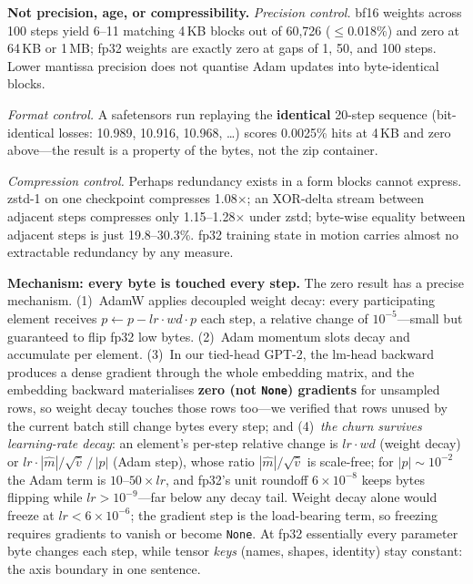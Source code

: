 \documentclass[sigconf,10pt,anonymous,review]{acmart}
\begin{document}
\noindent\textbf{Not precision, age, or compressibility.}
\emph{Precision control.} bf16 weights across 100 steps yield 6--11
matching 4\,KB blocks out of 60,726 ($\le$0.018\%) and zero at 64\,KB or
1\,MB; fp32 weights are exactly zero at gaps of 1, 50, and 100 steps.
Lower mantissa precision does not quantise Adam updates into
byte-identical blocks.

\emph{Format control.} A safetensors run replaying the \textbf{identical}
20-step sequence (bit-identical losses: 10.989, 10.916, 10.968, \dots)
scores 0.0025\% hits at 4\,KB and zero above---the result is a property
of the bytes, not the zip container.

\emph{Compression control.} Perhaps redundancy exists in a form blocks
cannot express. zstd-1 on one checkpoint compresses 1.08$\times$; an
XOR-delta stream between adjacent steps compresses only
1.15--1.28$\times$ under zstd; byte-wise equality between adjacent steps
is just 19.8--30.3\%. fp32 training state in motion carries almost no
extractable redundancy by any measure.

\noindent\textbf{Mechanism: every byte is touched every step.}
The zero result has a precise mechanism. (1)~AdamW applies decoupled
weight decay: every participating element receives
$p \leftarrow p - \mathit{lr}\cdot\mathit{wd}\cdot p$ each step, a
relative change of $10^{-5}$---small but guaranteed to flip fp32 low
bytes. (2)~Adam momentum slots decay and accumulate per element.
(3)~In our tied-head GPT-2, the lm-head backward produces a dense
gradient through the whole embedding matrix, and the embedding backward
materialises \textbf{zero (not \texttt{None}) gradients} for unsampled
rows, so weight decay touches those rows too---we verified that rows
unused by the current batch still change bytes every step; and
(4)~\emph{the churn survives learning-rate decay}: an element's
per-step relative change is $\mathit{lr}\cdot\mathit{wd}$ (weight decay)
or $\mathit{lr}\cdot|\hat m|/\sqrt{\hat v}\,/\,|p|$ (Adam step), whose
ratio $|\hat m|/\sqrt{\hat v}$ is scale-free; for $|p|\!\sim\!10^{-2}$
the Adam term is $10$--$50\times\mathit{lr}$, and fp32's unit roundoff
$6\times10^{-8}$ keeps bytes flipping while $\mathit{lr}>10^{-9}$---far
below any decay tail. Weight decay
alone would freeze at $\mathit{lr}<6\times10^{-6}$; the gradient step is
the load-bearing term, so freezing requires gradients to vanish or
become \texttt{None}. At fp32 essentially every
parameter byte changes each step, while tensor
\emph{keys} (names, shapes, identity) stay constant: the axis boundary
in one sentence.
\end{document}
